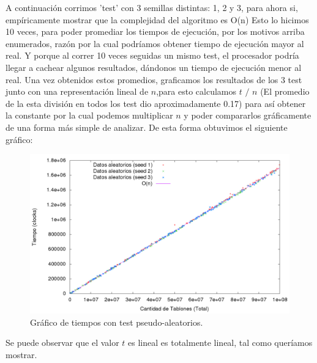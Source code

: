 A continuación corrimos 'test' con 3 semillas distintas: 1, 2 y 3, para ahora si, empíricamente mostrar que la complejidad del algoritmo es O(n)
Esto lo hicimos 10 veces, para poder promediar los tiempos de ejecución, por los motivos arriba enumerados, razón por la cual podríamos obtener tiempo de ejecución mayor al real. Y porque al correr 10 veces seguidas un mismo test, el procesador podría llegar a cachear algunos resultados, dándonos un tiempo de ejecución menor al real.
Una vez obtenidos estos promedios, graficamos los resultados de los 3 test junto con una representación lineal de $n$,para esto calculamos $t$ $/$ $n$ (El promedio de la esta división en todos los test dio aproximadamente 0.17) para así obtener la constante por la cual podemos multiplicar $n$ y poder compararlos gráficamente de una forma más simple de analizar.  De esta forma obtuvimos el siguiente gráfico:

\begin{figure}[H]
\begin{center}
\includegraphics[scale=0.4]{./imagenes/ej1_chartRendimiento.png}
\caption{Gr\'afico de tiempos con test pseudo-aleatorios.}
\end{center}
\end{figure}

Se puede observar que el valor $t$ es lineal es totalmente lineal, tal como queríamos mostrar.

